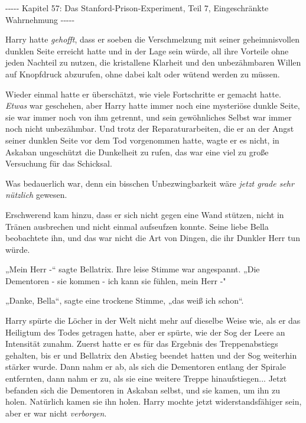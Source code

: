 

\hypertarget{das-stanford-prison-experiment-teil-7-eingeschruxe4nkte-wahrnehmung}{%

-\/-\/-\/-\/- Kapitel 57: Das Stanford-Prison-Experiment, Teil 7, Eingeschränkte Wahrnehmung -\/-\/-\/-\/-

Harry hatte \emph{gehofft}, dass er soeben die Verschmelzung mit seiner geheimnisvollen dunklen Seite erreicht hatte und in der Lage sein würde, all ihre Vorteile ohne jeden Nachteil zu nutzen, die kristallene Klarheit und den unbezähmbaren Willen auf Knopfdruck abzurufen, ohne dabei kalt oder wütend werden zu müssen.

Wieder einmal hatte er überschätzt, wie viele Fortschritte er gemacht hatte. \emph{Etwas} war geschehen, aber Harry hatte immer noch eine mysteriöse dunkle Seite, sie war immer noch von ihm getrennt, und sein gewöhnliches Selbst war immer noch nicht unbezähmbar. Und trotz der Reparaturarbeiten, die er an der Angst seiner dunklen Seite vor dem Tod vorgenommen hatte, wagte er es nicht, in Askaban ungeschützt die Dunkelheit zu rufen, das war eine viel zu große Versuchung für das Schicksal.

Was bedauerlich war, denn ein bisschen Unbezwingbarkeit wäre \emph{jetzt grade sehr nützlich} gewesen.

Erschwerend kam hinzu, dass er sich nicht gegen eine Wand stützen, nicht in Tränen ausbrechen und nicht einmal aufseufzen konnte. Seine liebe Bella beobachtete ihn, und das war nicht die Art von Dingen, die ihr Dunkler Herr tun würde.

„Mein Herr -“ sagte Bellatrix. Ihre leise Stimme war angespannt. „Die Dementoren - sie kommen - ich kann sie fühlen, mein Herr -"

„Danke, Bella“, sagte eine trockene Stimme, „das weiß ich schon“.

Harry spürte die Löcher in der Welt nicht mehr auf dieselbe Weise wie, als er das Heiligtum des Todes getragen hatte, aber er spürte, wie der Sog der Leere an Intensität zunahm. Zuerst hatte er es für das Ergebnis des Treppenabstiegs gehalten, bis er und Bellatrix den Abstieg beendet hatten und der Sog weiterhin stärker wurde. Dann nahm er ab, als sich die Dementoren entlang der Spirale entfernten, dann nahm er zu, als sie eine weitere Treppe hinaufstiegen... Jetzt befanden sich die Dementoren in Askaban selbst, und sie kamen, um ihn zu holen. Natürlich kamen sie ihn holen. Harry mochte jetzt widerstandsfähiger sein, aber er war nicht \emph{verborgen}.

}

